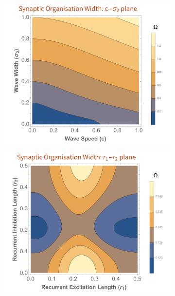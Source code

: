 \begin{figure}[h!]
	\centering
	\begin{subfigure}{0.45\textwidth}
		\centering
		\includegraphics[width=\textwidth]{images/nft_activity/width_cs2}
		\caption{}
	\end{subfigure}
	\begin{subfigure}{0.45\textwidth}
		\centering
		\includegraphics[width=\textwidth]{images/nft_activity/width_r1r2}
		\caption{}
	\end{subfigure}
	\begin{subfigure}{0.45\textwidth}

\end{subfigure}
\end{figure}
